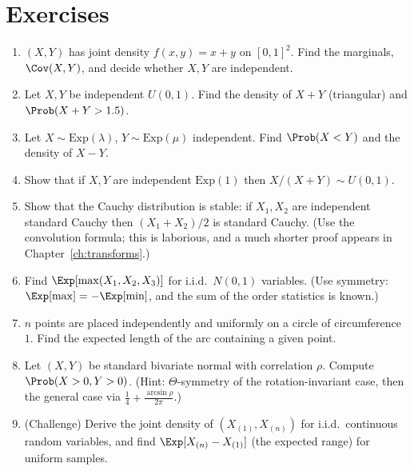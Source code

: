 \section*{Exercises}

\begin{enumerate}
\item $(X,Y)$ has joint density $f(x,y)=x+y$ on $[0,1]^2$. Find the marginals,
$\Cov(X,Y)$, and decide whether $X,Y$ are independent.
\item Let $X,Y$ be independent $U(0,1)$. Find the density of $X+Y$ (triangular) and
$\Prob(X+Y>1.5)$.
\item Let $X\sim\mathrm{Exp}(\lambda)$, $Y\sim\mathrm{Exp}(\mu)$ independent. Find
$\Prob(X<Y)$ and the density of $X-Y$.
\item Show that if $X,Y$ are independent $\mathrm{Exp}(1)$ then $X/(X+Y)\sim U(0,1)$.
\item Show that the Cauchy distribution is stable: if $X_1,X_2$ are independent
standard Cauchy then $(X_1+X_2)/2$ is standard Cauchy. (Use the convolution
formula; this is laborious, and a much shorter proof appears in
Chapter~\ref{ch:transforms}.)
\item Find $\Exp[\max(X_1,X_2,X_3)]$ for i.i.d.\ $N(0,1)$ variables. (Use
symmetry: $\Exp[\max]=-\Exp[\min]$, and the sum of the order statistics is
known.)
\item $n$ points are placed independently and uniformly on a circle of
circumference $1$. Find the expected length of the arc containing a given point.
\item Let $(X,Y)$ be standard bivariate normal with correlation $\rho$. Compute
$\Prob(X>0,Y>0)$. (Hint: $\Theta$-symmetry of the rotation-invariant case, then
the general case via $\frac14+\frac{\arcsin\rho}{2\pi}$.)
\item (Challenge) Derive the joint density of $(X_{(1)},X_{(n)})$ for i.i.d.\ continuous
random variables, and find $\Exp[X_{(n)}-X_{(1)}]$ (the expected range) for
uniform samples.
\end{enumerate}
